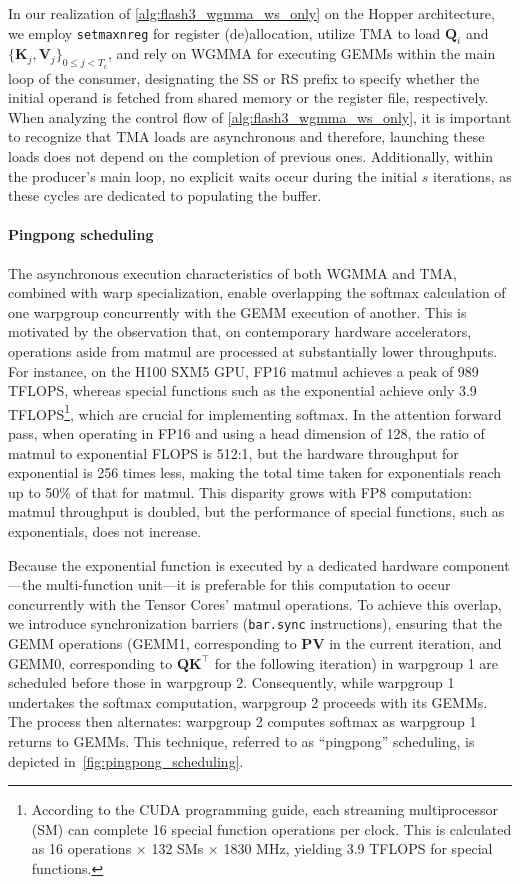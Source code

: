 In our realization of \cref{alg:flash3_wgmma_ws_only} on the Hopper architecture, we employ \verb|setmaxnreg| for register (de)allocation, utilize TMA to load $\mathbf{Q}_i$ and $\{ \mathbf{K}_j, \mathbf{V}_j \}_{0 \leq j < T_c}$, and rely on WGMMA for executing GEMMs within the main loop of the consumer, designating the SS or RS prefix to specify whether the initial operand is fetched from shared memory or the register file, respectively. When analyzing the control flow of \cref{alg:flash3_wgmma_ws_only}, it is important to recognize that TMA loads are asynchronous and therefore, launching these loads does not depend on the completion of previous ones. Additionally, within the producer's main loop, no explicit waits occur during the initial $s$ iterations, as these cycles are dedicated to populating the buffer.

\paragraph{Pingpong scheduling} The asynchronous execution characteristics of both WGMMA and TMA, combined with warp specialization, enable overlapping the softmax calculation of one warpgroup concurrently with the GEMM execution of another. This is motivated by the observation that, on contemporary hardware accelerators, operations aside from matmul are processed at substantially lower throughputs. For instance, on the H100 SXM5 GPU, FP16 matmul achieves a peak of 989 TFLOPS, whereas special functions such as the exponential achieve only 3.9 TFLOPS\footnote{According to the CUDA programming guide, each streaming multiprocessor (SM) can complete 16 special function operations per clock. This is calculated as 16 operations $\times$ 132 SMs $\times$ 1830 MHz, yielding 3.9 TFLOPS for special functions.}, which are crucial for implementing softmax. In the attention forward pass, when operating in FP16 and using a head dimension of 128, the ratio of matmul to exponential FLOPS is 512:1, but the hardware throughput for exponential is 256 times less, making the total time taken for exponentials reach up to 50\% of that for matmul. This disparity grows with FP8 computation: matmul throughput is doubled, but the performance of special functions, such as exponentials, does not increase.

Because the exponential function is executed by a dedicated hardware component—the multi-function unit—it is preferable for this computation to occur concurrently with the Tensor Cores' matmul operations. To achieve this overlap, we introduce synchronization barriers (\texttt{bar.sync} instructions), ensuring that the GEMM operations (GEMM1, corresponding to $\mathbf{P} \mathbf{V}$ in the current iteration, and GEMM0, corresponding to $\mathbf{Q} \mathbf{K}^\top$ for the following iteration) in warpgroup 1 are scheduled before those in warpgroup 2. Consequently, while warpgroup 1 undertakes the softmax computation, warpgroup 2 proceeds with its GEMMs. The process then alternates: warpgroup 2 computes softmax as warpgroup 1 returns to GEMMs. This technique, referred to as ``pingpong'' scheduling, is depicted in~\cref{fig:pingpong_scheduling}. 

